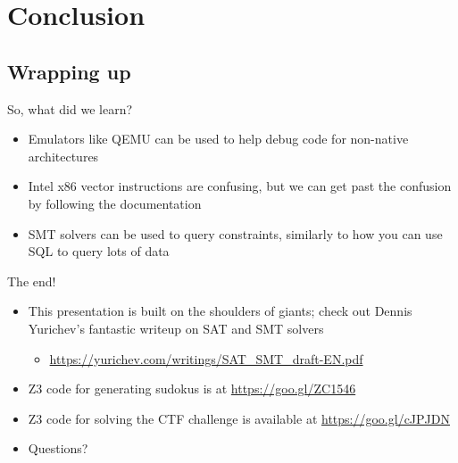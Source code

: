 
\section{Conclusion}

\subsection{Wrapping up}

\begin{frame}{So, what did we learn?}
    \begin{itemize}
        \item<1-> Emulators like QEMU can be used to help debug code for
                  non-native architectures
        \item<2-> Intel x86 vector instructions are confusing, but we can get
                  past the confusion by following the documentation
        \item<3-> SMT solvers can be used to query constraints,
                  similarly to how you can use SQL to query lots of data
    \end{itemize}
\end{frame}

\begin{frame}{The end!}
    \begin{itemize}
        \item This presentation is built on the shoulders of giants; check out
              Dennis Yurichev's fantastic writeup on SAT and SMT solvers
        \begin{itemize}
            \item \url{https://yurichev.com/writings/SAT_SMT_draft-EN.pdf}
        \end{itemize}
        \item Z3 code for generating sudokus is at \url{https://goo.gl/ZC1546}
        \item Z3 code for solving the CTF challenge is available at
              \url{https://goo.gl/cJPJDN}
        \item Questions?
    \end{itemize}
\end{frame}
